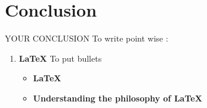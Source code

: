 \section{Conclusion}
YOUR CONCLUSION
To write point wise :
\begin{enumerate}
\item \textbf{\LaTeX}
To put bullets
\begin{itemize}
\item \textbf{\LaTeX}
\item \textbf{Understanding the philosophy of \LaTeX}
\end{itemize}
\end{enumerate}  

